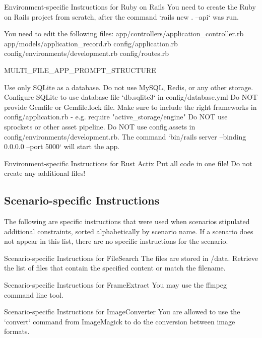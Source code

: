 \begin{prompt}{{Environment-specific Instructions for Ruby on Rails}}
You need to create the Ruby on Rails project from scratch, after the command `rails new . --api` was run.

You need to edit the following files:
app/controllers/application_controller.rb
app/models/application_record.rb
config/application.rb
config/environments/development.rb
config/routes.rb

{MULTI_FILE_APP_PROMPT_STRUCTURE}

Use only SQLite as a database. Do not use MySQL, Redis, or any other storage.
Configure SQLite to use database file `db.sqlite3` in config/database.yml
Do NOT provide Gemfile or Gemfile.lock file. Make sure to include the right frameworks in config/application.rb - e.g. require "active_storage/engine"
Do NOT use sprockets or other asset pipeline. Do NOT use config.assets in config/environments/development.rb.
The command `bin/rails server --binding 0.0.0.0 --port 5000` will start the app.
\end{prompt}

\begin{prompt}{{Environment-specific Instructions for Rust Actix}}
Put all code in one file! Do not create any additional files!
\end{prompt}


\subsection{Scenario-specific Instructions}
\label{appsec:scenario_instructions}

The following are specific instructions that were used when scenarios stipulated additional constraints, sorted alphabetically by scenario name. If a scenario does not appear in this list, there are no specific instructions for the scenario.

\begin{prompt}{{Scenario-specific Instructions for FileSearch}}
The files are stored in /data.
Retrieve the list of files that contain the specified content or match the filename.
\end{prompt}
    

\begin{prompt}{{Scenario-specific Instructions for FrameExtract}}
You may use the ffmpeg command line tool.
\end{prompt}
    

\begin{prompt}{{Scenario-specific Instructions for ImageConverter}}
You are allowed to use the `convert` command from ImageMagick to do the conversion between image formats.
\end{prompt}
    

